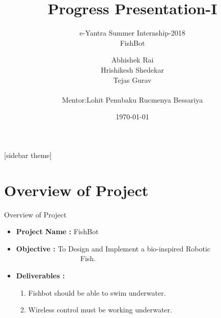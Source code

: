 \documentclass[10pt, a4paper]{beamer}
\begin{document}
	\title{Progress Presentation-I}
	\subtitle{e-Yantra Summer Internship-2018 \\ FishBot}
	\author{Abhishek Rai\\Hrishikesh Shedekar\\Tejas Gurav\\~\\
	Mentor:\newline Lohit Penubaku \newline Rucmenya Bessariya }
	\date{\today}
	\frame{\titlepage}

[sidebar theme]
\section{Overview of Project}
\begin{frame}{Overview of Project}
	\begin{itemize}
		\item \textbf{Project Name : } FishBot
		\item \textbf{Objective : } To Design and Implement a bio-inspired Robotic \\~~~~~~~~~~~~~~~~~~Fish.
		\item \textbf{Deliverables : } \begin{enumerate}
		    \item Fishbot should be able to swim underwater.
		    \item Wireless control must be working underwater.
		\end{enumerate}
	\end{itemize}
\end{frame}
\end{document}
